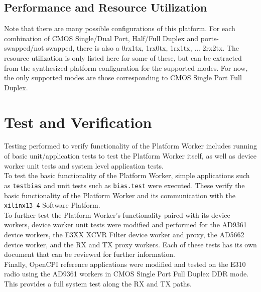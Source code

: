 \documentclass{article}
\newcommand{\code}[1]{\texttt{#1}} %
\edef\ecomp{e3xx}
\begin{document}
\begin{landscape}
\section*{Performance and Resource Utilization}

\end{landscape}

\noindent Note that there are many possible configurations of this platform. For each combination of CMOS Single/Dual Port, Half/Full Duplex and ports-swapped/not swapped, there is also a 0rx1tx, 1rx0tx, 1rx1tx, ... 2rx2tx. The resource utilization is only listed here for some of these, but can be extracted from the synthesized platform configuration for the supported modes. For now, the only supported modes are those corresponding to CMOS Single Port Full Duplex.
\section*{Test and Verification}
\noindent Testing performed to verify functionality of the Platform Worker includes running of basic unit/application tests to test the Platform Worker itself, as well as device worker unit tests and system level application tests. \\

\noindent To test the basic functionality of the Platform Worker, simple applications such as \code{testbias} and unit tests such as \code{bias.test} were executed. These verify the basic functionality of the Platform Worker and its communication with the \code{xilinx13\_4} Software Platform. \\

\noindent To further test the Platform Worker's functionality paired with its device workers, device worker unit tests were modified and performed for the AD9361 device workers, the E3XX XCVR Filter device worker and proxy, the AD5662 device worker, and the RX and TX proxy workers. Each of these tests has its own document that can be reviewed for further information. \\

\noindent Finally, OpenCPI reference applications were modified and tested on the E310 radio using the AD9361 workers in CMOS Single Port Full Duplex DDR mode. This provides a full system test along the RX and TX paths.
\end{document}
